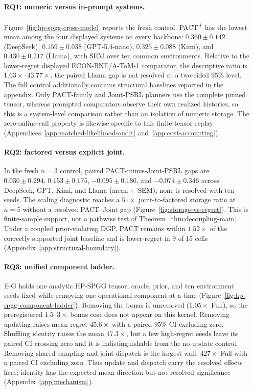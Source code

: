 \documentclass[letterpaper]{article} %
\begin{document}
\paragraph{RQ1: numeric versus in-prompt systems.} Figure~\ref{fig:hp-spgg-cross-model} reports the fresh control. PACT\textsuperscript{+} has the lowest mean among the four displayed systems on every backbone: $0.360\pm0.142$ (DeepSeek), $0.159\pm0.038$ (GPT-5.4-nano), $0.325\pm0.088$ (Kimi), and $0.430\pm0.217$ (Llama), with SEM over ten common environments. Relative to the lower-regret displayed ECON-BNE/A-ToM-1 comparator, the descriptive ratio is $1.63\times$--$43.77\times$; the paired Llama gap is not resolved at a two-sided 95\% level. The full control additionally contains structural baselines reported in the appendix. Only PACT-family and Joint-PSRL planners use the complete pinned tensor, whereas prompted comparators observe their own realized histories, so this is a system-level comparison rather than an isolation of numeric storage. The zero-online-call property is likewise specific to this finite tensor replay (Appendices~\ref{app:matched-likelihood-audit} and~\ref{app:cost-accounting}).

\paragraph{RQ2: factored versus explicit joint.} In the fresh $n{=}3$ control, paired PACT-minus-Joint-PSRL gaps are $0.030\pm0.294$, $0.153\pm0.175$, $-0.095\pm0.180$, and $-0.074\pm0.346$ across DeepSeek, GPT, Kimi, and Llama (mean $\pm$ SEM); none is resolved with ten seeds. The scaling diagnostic reaches a $51\times$ joint-to-factored storage ratio at $n=5$ without a resolved PACT--Joint gap (Figure~\ref{fig:storage-vs-regret}). This is finite-sample support, not a pathwise test of Theorem~\ref{thm:decoupling-main}. Under a coupled prior-violating DGP, PACT remains within $1.52\times$ of the correctly supported joint baseline and is lower-regret in $9$ of $15$ cells (Appendix~\ref{app:structural-boundary}).

\paragraph{RQ3: unified component ladder.} E-G holds one analytic HP-SPGG tensor, oracle, prior, and ten environment seeds fixed while removing one operational component at a time (Figure~\ref{fig:hp-spgg-component-ladder}). Removing the bonus is unresolved ($1.05\times$ Full), so the preregistered $1.5$--$3\times$ bonus cost does not appear on this kernel. Removing updating raises mean regret $45.6\times$ with a paired 95\% CI excluding zero. Shuffling identity raises the mean $47.3\times$, but a few high-regret seeds leave its paired CI crossing zero and it is indistinguishable from the no-update control. Removing shared sampling and joint dispatch is the largest wall: $427\times$ Full with a paired CI excluding zero. Thus update and dispatch carry the resolved effects here; identity has the expected mean direction but not resolved significance (Appendix~\ref{app:mechanism}).
\end{document}
